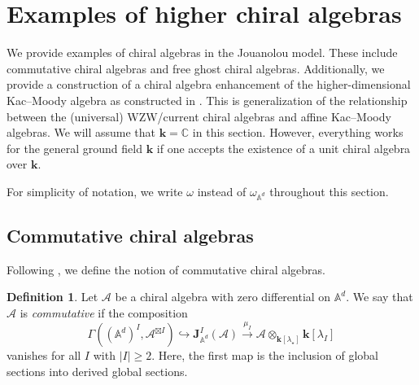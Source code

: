 \documentclass[11pt]{amsart}
\theoremstyle{definition}
\newtheorem{defn}[thm]{Definition}
\theoremstyle{remark}
\numberwithin{equation}{section}
\newcommand{\kk}{\mathbf{k}}
\begin{document}
\section{Examples of higher chiral algebras}\label{s:example}

We provide examples of chiral algebras in the Jouanolou model.
These include commutative chiral algebras and free ghost chiral algebras.
Additionally, we provide a construction of a chiral algebra enhancement of the higher-dimensional Kac--Moody algebra as
constructed in \cite{FHK}.
This is generalization of the relationship between the (universal) WZW/current chiral algebras and affine Kac--Moody algebras. We will assume that $\kk=\mathbb{C}$ in this section. However, everything works for the general ground field $\mathbf{k}$ if one accepts the existence of a unit chiral algebra over $\kk$.

For simplicity of notation, we write $\omega$ instead of $\omega_{\mathbb{A}^d}$ throughout this section.
\subsection{Commutative chiral algebras}
Following \cite{BD}, we define the notion of commutative chiral algebras.
\begin{defn}
   Let $\mathcal{A}$ be a chiral algebra with zero differential on $\mathbb{A}^d$. We say that $\mathcal{A}$ is
   \textit{commutative} if the composition
$$
\Gamma\left((\mathbb{A}^d)^{{I}},\mathcal{A}^{\boxtimes {I}}\right)\hookrightarrow \mathbf{J}^{{I}}_{\mathbb{A}^d}(\mathcal{A})\xrightarrow{\mu_{{I}}}\mathcal{A}\otimes_{\mathbf{k}[\lambda_{\star}]}\mathbf{k}[\lambda_I]
$$
    vanishes for all $I$ with $|I|\geq 2$.
    Here, the first map is the inclusion of global sections into derived global sections.
\end{defn}
\end{document}
